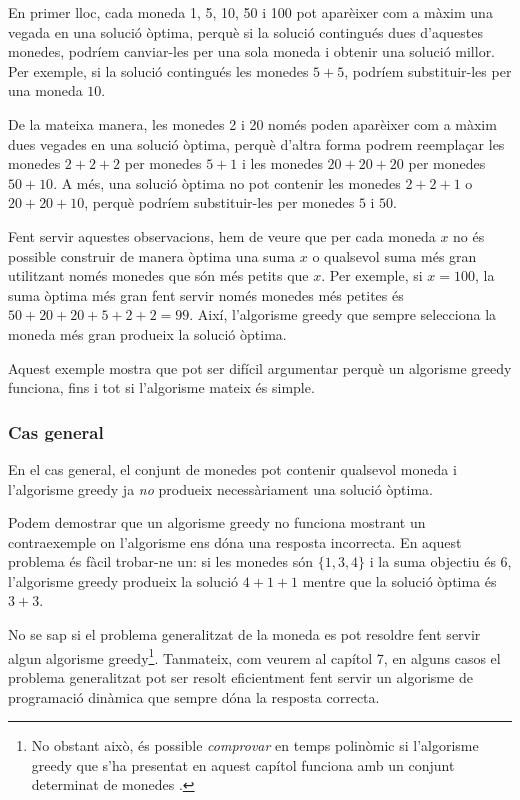 En primer lloc, cada moneda 1, 5, 10, 50 i 100
pot aparèixer com a màxim una vegada en una solució òptima,
perquè si la solució contingués dues d'aquestes monedes,
podríem canviar-les per una sola moneda i
obtenir una solució millor.
Per exemple, si la solució contingués
les monedes $5+5$, podríem substituir-les per una moneda $10$.

De la mateixa manera, les monedes 2 i 20
només poden aparèixer com a màxim dues vegades en una
solució òptima, perquè d'altra forma podrem reemplaçar
les monedes $2+2+2$ per monedes $5+1$ i
les monedes $20+20+20$ per monedes $50+10$.
A més, una solució òptima no pot contenir
les monedes $2+2+1$ o $20+20+10$,
perquè podríem substituir-les per monedes $5$ i $50$.

Fent servir aquestes observacions,
hem de veure que per cada moneda $x$
no és possible construir de manera òptima
una suma $x$ o qualsevol suma més gran utilitzant només monedes
que són més petits que $x$.
Per exemple, si $x=100$, la suma òptima més gran fent
servir només monedes més petites és $50+20+20+5+2+2=99$.
Així, l'algorisme greedy que sempre selecciona
la moneda més gran produeix la solució òptima.

Aquest exemple mostra que pot ser difícil argumentar perquè un
algorisme greedy funciona, fins i tot si l'algorisme mateix és
simple.

\subsubsection{Cas general}

En el cas general, el conjunt de monedes pot contenir qualsevol moneda
i l'algorisme greedy ja \emph{no} produeix necessàriament
una solució òptima.

Podem demostrar que un algorisme greedy no funciona
mostrant un contraexemple
on l'algorisme ens dóna una resposta incorrecta.
En aquest problema és fàcil trobar-ne un:
si les monedes són $\{1,3,4\}$ i la suma objectiu
és 6, l'algorisme greedy produeix la solució
$4+1+1$ mentre que la solució òptima és $3+3$.

No se sap si el problema generalitzat de la moneda
es pot resoldre fent servir algun algorisme greedy\footnote{
No obstant això, és possible
\emph{comprovar} en temps polinòmic
si l'algorisme greedy que s'ha presentat en aquest capítol funciona
amb un conjunt determinat de monedes \cite{pea05}.}.
Tanmateix, com veurem al capítol 7,
en alguns casos el problema generalitzat pot ser
resolt eficientment fent servir un algorisme de programació
dinàmica que sempre dóna la resposta correcta.

